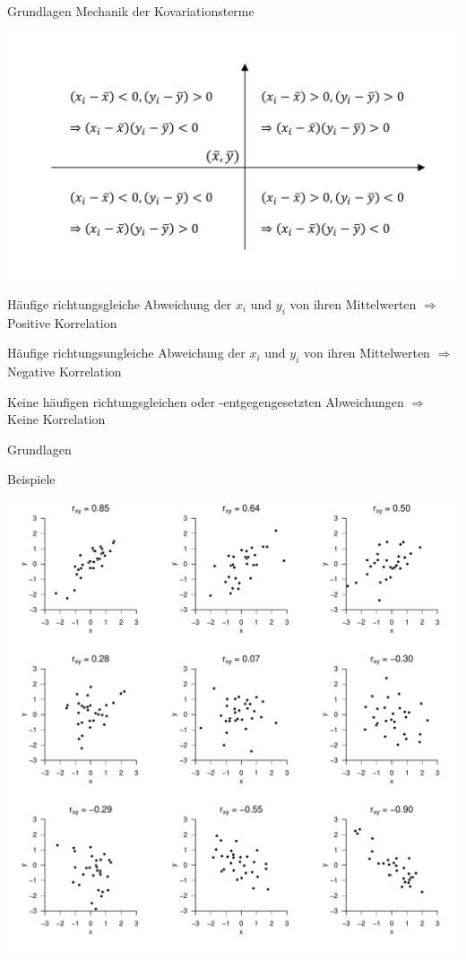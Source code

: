 \documentclass[
  8pt,
  ignorenonframetext,
]{beamer}
\begin{document}
\begin{frame}{Grundlagen}
\protect\hypertarget{grundlagen-6}{}
Mechanik der Kovariationsterme

\begin{center}\includegraphics[width=0.8\linewidth]{2_Abbildungen/alm_2_korrelationsterme} \end{center}

\center
\footnotesize

Häufige richtungsgleiche Abweichung der \(x_i\) und \(y_i\) von ihren
Mittelwerten \(\Rightarrow\) Positive Korrelation

Häufige richtungsungleiche Abweichung der \(x_i\) und \(y_i\) von ihren
Mittelwerten \(\Rightarrow\) Negative Korrelation

Keine häufigen richtungsgleichen oder -entgegengesetzten Abweichungen
\(\Rightarrow\) Keine Korrelation
\end{frame}

\begin{frame}{Grundlagen}
\protect\hypertarget{grundlagen-7}{}
\vspace{2mm}

Beispiele

\begin{center}\includegraphics[width=0.6\linewidth]{2_Abbildungen/alm_2_korrelationsbeispiele} \end{center}
\end{frame}
\end{document}
